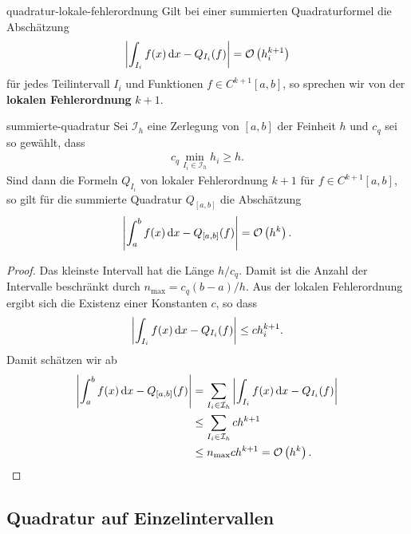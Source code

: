 \begin{Definition}{quadratur-lokale-fehlerordnung}
  Gilt bei einer summierten Quadraturformel die Abschätzung
  \begin{gather}
    \left|\int_{I_i} f(x)\,\mathrm{d} x - Q_{I_i}(f)\right|
    =\mathcal O\left(h_i^{k+1}\right)
  \end{gather}
  für jedes Teilintervall $I_i$ und Funktionen $f\in C^{k+1}[a,b]$, so
  sprechen wir von der \textbf{lokalen
    Fehlerordnung} $k+1$.
\end{Definition}

\begin{Satz}{summierte-quadratur}
  Sei $\mathcal I_h$ eine Zerlegung von $[a,b]$ der Feinheit $h$ und
  $c_q$ sei so gewählt, dass
  \begin{gather}
    c_q \min_{I_i\in \mathcal I_h} h_i \ge h.
  \end{gather}
  Sind dann die Formeln $Q_{I_i}$ von lokaler Fehlerordnung $k+1$ für
  $f\in C^{k+1}[a,b]$, so gilt für die summierte Quadratur $Q_{[a,b]}$
  die Abschätzung
  \begin{gather}
    \left|\int_a^b f(x)\,\mathrm{d} x - Q_{[a,b]}(f)\right|
    = \mathcal O\left(h^{k}\right).
  \end{gather}
\end{Satz}

\begin{proof}
  Das kleinste Intervall hat die Länge $h/c_q$. Damit ist die Anzahl
  der Intervalle beschränkt durch $n_{\max}=c_q (b-a)/h$. Aus der
  lokalen Fehlerordnung ergibt sich die Existenz einer Konstanten $c$,
  so dass
  \begin{gather}
    \left|\int_{I_i} f(x)\,\mathrm{d} x - Q_{I_i}(f)\right| \le c h_i^{k+1}.
  \end{gather}
  Damit schätzen wir ab
  \begin{align}
    \left|\int_a^b f(x)\,\mathrm{d} x - Q_{[a,b]}(f)\right|
    &= \sum_{I_i\in\mathcal I_h}  \left|\int_{I_i} f(x)\,\mathrm{d} x - Q_{I_i}(f)\right|\\
    &\le \sum_{I_i\in\mathcal I_h} c h^{k+1}\\
    & \le n_{\max} c h^{k+1} = \mathcal O\left(h^{k}\right).
  \end{align}
\end{proof}

\subsection{Quadratur auf Einzelintervallen}

